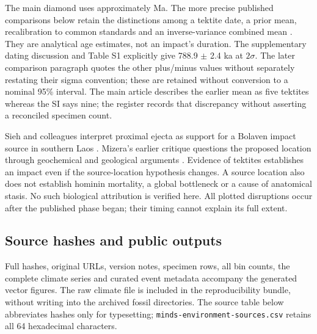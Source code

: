 The main diamond uses approximately \MwcImpactAge{} Ma. The more precise published comparisons below retain the distinctions among a tektite date, a prior mean, recalibration to common standards and an inverse-variance combined mean \citep{sieh2023}. They are analytical age estimates, not an impact's duration. The supplementary dating discussion and Table S1 explicitly give 788.9 $\pm$ 2.4 ka at $2\sigma$. The later comparison paragraph quotes the other plus/minus values without separately restating their sigma convention; these are retained without conversion to a nominal 95\% interval. The main article describes the earlier mean as five tektites whereas the SI says nine; the register records that discrepancy without asserting a reconciled specimen count.



Sieh and colleagues interpret proximal ejecta as support for a Bolaven impact source in southern Laos \citep{sieh2023}. Mizera's earlier critique questions the proposed location through geochemical and geological arguments \citep{mizera2022}. Evidence of tektites establishes an impact even if the source-location hypothesis changes. A source location also does not establish hominin mortality, a global bottleneck or a cause of anatomical stasis. No such biological attribution is verified here. All plotted disruptions occur after the published phase began; their timing cannot explain its full extent.

\subsection{Source hashes and public outputs}

Full hashes, original URLs, version notes, specimen rows, all bin counts, the complete climate series and curated event metadata accompany the generated vector figures. The raw climate file is included in the reproducibility bundle, without writing into the archived fossil directories. The source table below abbreviates hashes only for typesetting; \texttt{minds-environment-sources.csv} retains all 64 hexadecimal characters.


